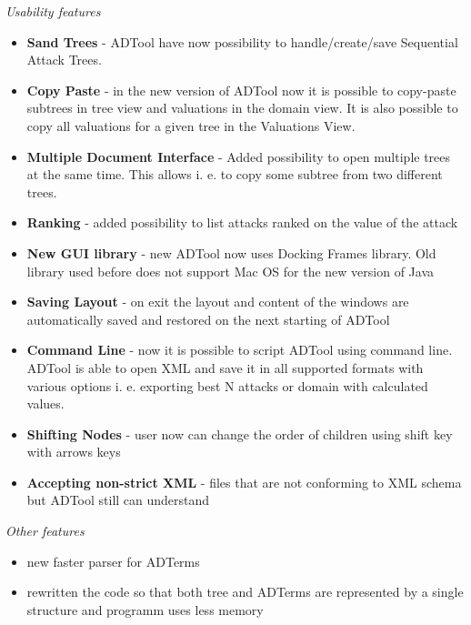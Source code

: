 \emph{Usability features}

\begin{itemize}
\item
  \textbf{Sand Trees} - ADTool have now possibility to
  handle/create/save Sequential Attack Trees.
\item
  \textbf{Copy Paste} - in the new version of ADTool now it is possible
  to copy-paste subtrees in tree view and valuations in the domain view.
  It is also possible to copy all valuations for a given tree in the
  Valuations View.
\item
  \textbf{Multiple Document Interface} - Added possibility to open
  multiple trees at the same time. This allows i. e. to copy some
  subtree from two different trees.
\item
  \textbf{Ranking} - added possibility to list attacks ranked on the
  value of the attack
\item
  \textbf{New GUI library} - new ADTool now uses Docking Frames library.
  Old library used before does not support Mac OS for the new version of
  Java
\item
  \textbf{Saving Layout} - on exit the layout and content of the windows
  are automatically saved and restored on the next starting of ADTool
\item
  \textbf{Command Line} - now it is possible to script ADTool using
  command line. ADTool is able to open XML and save it in all supported
  formats with various options i. e. exporting best N attacks or domain
  with calculated values.
\item
  \textbf{Shifting Nodes} - user now can change the order of children
  using shift key with arrows keys
\item
  \textbf{Accepting non-strict XML} - files that are not conforming to
  XML schema but ADTool still can understand
\end{itemize}

\emph{Other features}

\begin{itemize}
\item
  new faster parser for ADTerms
\item
  rewritten the code so that both tree and ADTerms are represented by a
  single structure and programm uses less memory
\end{itemize}
